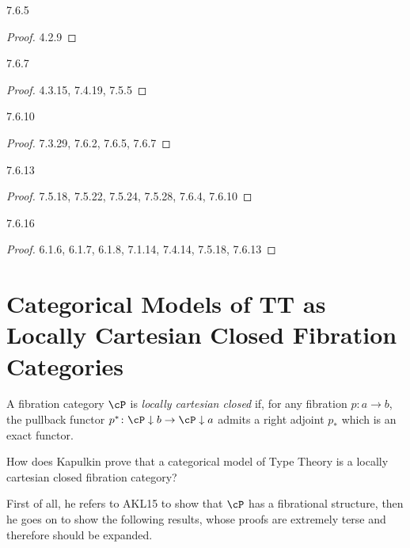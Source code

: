 \documentclass[a4paper,12pt]{scrartcl}
\begin{document}
\begin{lem}
  7.6.5
\end{lem}
\begin{proof}
  4.2.9
\end{proof}

\begin{lem}
  7.6.7
\end{lem}
\begin{proof}
  4.3.15, 7.4.19, 7.5.5
\end{proof}

\begin{thm}
  7.6.10
\end{thm}
\begin{proof}
  7.3.29, 7.6.2, 7.6.5, 7.6.7
\end{proof}

\begin{cor}
  7.6.13
\end{cor}
\begin{proof}
  7.5.18, 7.5.22, 7.5.24, 7.5.28, 7.6.4, 7.6.10
\end{proof}

\begin{thm}
  7.6.16
\end{thm}
\begin{proof}
  6.1.6, 6.1.7, 6.1.8, 7.1.14, 7.4.14, 7.5.18, 7.6.13
\end{proof}

\section{Categorical Models of TT as Locally Cartesian Closed Fibration
Categories}

\begin{defn}
  A fibration category $\cP$ is \emph{locally cartesian closed} if, for any
  fibration $p\colon a\rightarrow b$, the pullback functor
  $p^*\colon\cP\downarrow b\rightarrow\cP\downarrow a$ admits a right adjoint
  $p_*$ which is an exact functor.
\end{defn}

How does Kapulkin prove that a categorical model of Type Theory is a locally
cartesian closed fibration category?

First of all, he refers to AKL15 to show that $\cP$ has a fibrational structure,
then he goes on to show the following results, whose proofs are extremely terse
and therefore should be expanded.

\end{document}

